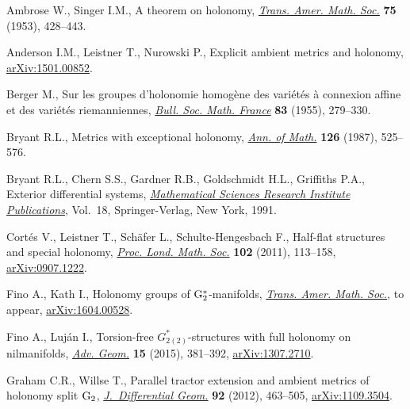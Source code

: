 \documentclass[pdftex]{sigma}
\numberwithin{equation}{section}
\begin{document}
\begin{thebibliography}{99}
\footnotesize\itemsep=0pt

Ambrose W., Singer I.M., A theorem on holonomy, \href{https://doi.org/10.2307/1990721}{\textit{Trans. Amer. Math.
 Soc.}} \textbf{75} (1953), 428--443.

Anderson I.M., Leistner T., Nurowski P., Explicit ambient metrics and holonomy,
 \href{https://arxiv.org/abs/1501.00852}{arXiv:1501.00852}.

Berger M., Sur les groupes d'holonomie homog\`ene des vari\'et\'es \`a
 connexion affine et des vari\'et\'es rieman\-nien\-nes, \href{https://doi.org/10.24033/bsmf.1464}{\textit{Bull. Soc. Math.
 France}} \textbf{83} (1955), 279--330.

Bryant R.L., Metrics with exceptional holonomy, \href{https://doi.org/10.2307/1971360}{\textit{Ann. of Math.}}
 \textbf{126} (1987), 525--576.

Bryant R.L., Chern S.S., Gardner R.B., Goldschmidt H.L., Griffiths P.A.,
 Exterior differential systems, \href{https://doi.org/10.1007/978-1-4613-9714-4}{\textit{Mathematical Sciences Research
 Institute Publications}}, Vol.~18, Springer-Verlag, New York, 1991.

Cort\'es V., Leistner T., Sch\"afer L., Schulte-Hengesbach F., Half-flat
 structures and special holonomy, \href{https://doi.org/10.1112/plms/pdq012}{\textit{Proc. Lond. Math. Soc.}} \textbf{102}
 (2011), 113--158, \href{https://arxiv.org/abs/0907.1222}{arXiv:0907.1222}.

Fino A., Kath I., Holonomy groups of ${\rm G}_{2}^*$-manifolds, \href{https://doi.org/10.1090/tran/7427}{\textit{Trans.
 Amer. Math. Soc.}}, {t}o appear, \href{https://arxiv.org/abs/1604.00528}{arXiv:1604.00528}.

Fino A., Luj\'an I., Torsion-free {$G^*_{2(2)}$}-structures with full holonomy
 on nilmanifolds, \href{https://doi.org/10.1515/advgeom-2015-0015}{\textit{Adv. Geom.}} \textbf{15} (2015), 381--392,
 \href{https://arxiv.org/abs/1307.2710}{arXiv:1307.2710}.

Graham C.R., Willse T., Parallel tractor extension and ambient metrics of
 holonomy split {${\rm G}_2$}, \href{https://doi.org/10.4310/jdg/1354110197}{\textit{J.~Differential Geom.}} \textbf{92}
 (2012), 463--505, \href{https://arxiv.org/abs/1109.3504}{arXiv:1109.3504}.


\end{thebibliography}
\end{document}
